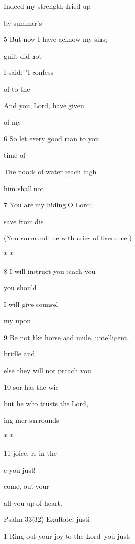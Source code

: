 Indeed my strength  dried up 

 by  summer's  

5 But now I have acknow my sins; 

 guilt  did not  

I said: "I  confess 

 of to the  

And you, Lord, have given 

  of my  

6 So let every good man  to you 

  time of  

The floods of water  reach high 

 him  shall not  

7 You are my hiding  O Lord; 

 save  from dis 

(You surround me with cries of liverance.) 

\mi{*} \pl{* * *} * * \pl{*} 

8 I will instruct you  teach you 

  you should  

I will give  counsel 

 my  upon  

9 Be not like horse and mule, untelligent, 

 bridle and  

else they will not proach you. 

10  sor has the wic 

but he who trusts  the Lord, 

ing mer surrounds  

\pl{*} * * 

11 joice, re in the  

e you just! 

 come,  out your  

all you up of heart. 

Psalm 33(32) Exultate, justi 


1 Ring out your joy to the Lord,  you just; 

